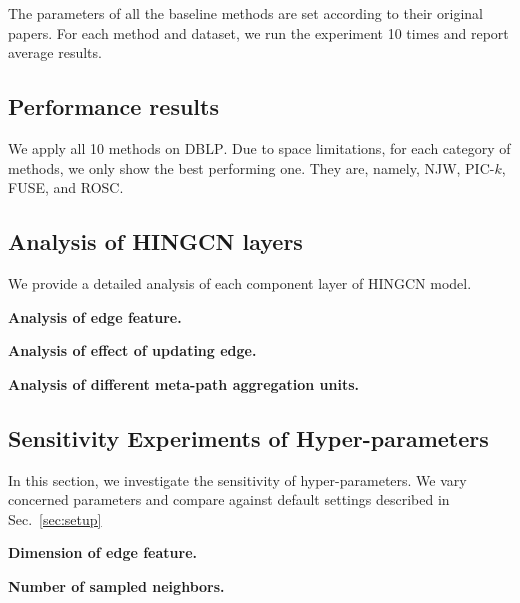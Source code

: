 The parameters of all the baseline methods are set according to their original papers.
For each method and dataset,
we run the experiment 10 times and report average results.

\subsection{Performance results}
\label{sec:results}

We apply all 10 methods on \textsc{DBLP}. 
Due to space limitations, for each category of methods, we only show the best performing one. 
They are, namely, NJW, PIC-$k$, FUSE, and ROSC. 

\subsection{Analysis of HINGCN layers}
We provide a detailed analysis of each component layer of HINGCN model.

\textbf{Analysis of edge feature.}

\textbf{Analysis of effect of updating edge.}

\textbf{Analysis of different meta-path aggregation units.}

\subsection{Sensitivity Experiments of Hyper-parameters}
In this section, we investigate the sensitivity of hyper-parameters. We vary concerned parameters and compare against default settings described in Sec.~\ref{sec:setup} 

\textbf{Dimension of edge feature.}

\textbf{Number of sampled neighbors.}






